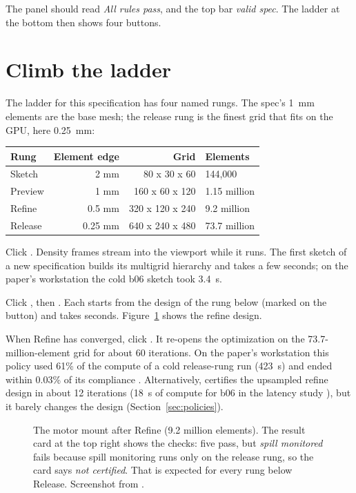 The  panel should read \emph{All rules pass}, and the top bar \emph{valid spec}. The ladder at the bottom
then shows four buttons.

\section{Climb the ladder}
The ladder for this specification has four named rungs. The spec's 1~mm elements are the base mesh; the release rung is
the finest grid that fits on the GPU, here 0.25~mm:

\begin{center}\small\sffamily
\begin{tabular}{@{}lrrl@{}}
\toprule
Rung & Element edge & Grid & Elements \\ \midrule
Sketch & 2 mm & 80 x 30 x 60 & 144,000 \\
Preview & 1 mm & 160 x 60 x 120 & 1.15 million \\
Refine & 0.5 mm & 320 x 120 x 240 & 9.2 million \\
Release & 0.25 mm & 640 x 240 x 480 & 73.7 million \\
\bottomrule
\end{tabular}
\end{center}

\begin{steps}
\item Click . Density frames stream into the viewport while it runs. The first sketch of a new
specification builds its multigrid hierarchy and takes a few seconds; on the paper's workstation the cold b06 sketch
took 3.4~s.
\item Click , then . Each starts from the design of the rung below (marked \gui{$\uparrow$}
on the button) and takes seconds. Figure~\ref{fig:b06refine} shows the refine design.
\item When Refine has converged, click . It re-opens the optimization on the 73.7-million-element
grid for about 60 iterations. On the paper's workstation this policy used 61\% of the compute of a cold release-rung run
(423~s) and ended within 0.03\% of its compliance . Alternatively,  certifies the upsampled
refine design in about 12 iterations (18~s of compute for b06 in the latency study ), but it barely changes
the design (Section~\ref{sec:policies}).
\end{steps}

\begin{figure}[t]
\caption{The motor mount after Refine (9.2 million elements). The result card at the top right shows the checks: five
pass, but \emph{spill monitored} fails because spill monitoring runs only on the release rung, so the card says
\emph{not certified}. That is expected for every rung below Release. Screenshot from .}
\label{fig:b06refine}
\end{figure}

